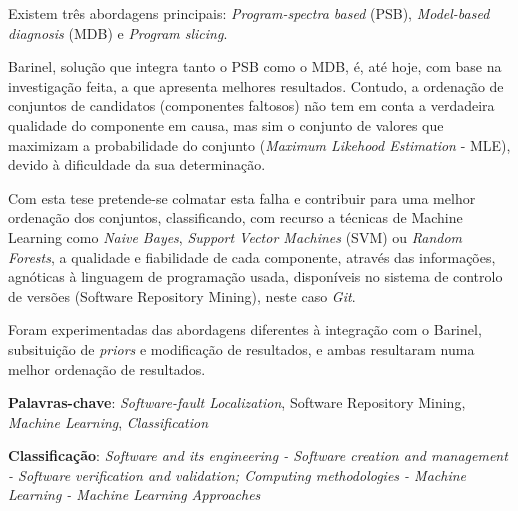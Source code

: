 Existem três abordagens principais: \emph{Program-spectra based} (PSB), \emph{Model-based diagnosis} (MDB) e \emph{Program slicing}.

Barinel, solução que integra tanto o PSB como o MDB, é, até hoje, com base na investigação feita, a que apresenta melhores resultados. Contudo, a ordenação de conjuntos de candidatos (componentes faltosos) não tem em conta a verdadeira qualidade do componente em causa, mas sim o conjunto de valores que maximizam a probabilidade do conjunto (\emph{Maximum Likehood Estimation} - MLE), devido à dificuldade da sua determinação.

Com esta tese pretende-se colmatar esta falha e contribuir para uma melhor ordenação dos conjuntos, classificando, com recurso a técnicas de Machine Learning como \emph{Naive Bayes}, \emph{Support Vector Machines} (SVM) ou \emph{Random Forests}, a qualidade e fiabilidade de cada componente, através das informações, agnóticas à linguagem de programação usada, disponíveis no sistema de controlo de versões (Software Repository Mining), neste caso \emph{Git}.

Foram experimentadas das abordagens diferentes à integração com o Barinel, subsituição de \emph{priors} e modificação de resultados, e ambas resultaram numa melhor ordenação de resultados.

\vspace*{10mm}\noindent

\textbf{Palavras-chave}: \emph{Software-fault Localization}, Software Repository Mining, \emph{Machine Learning}, \emph{Classification}

\vspace*{5mm}\noindent

\textbf{Classificação}: \emph{Software and its engineering - Software creation and management - Software verification and validation; Computing methodologies - Machine Learning - Machine Learning Approaches}